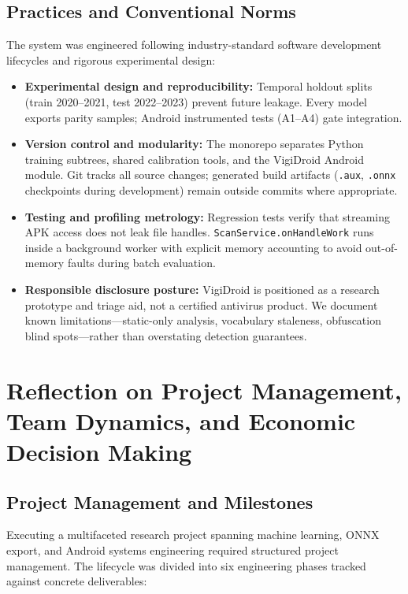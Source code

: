 \subsection{Practices and Conventional Norms}
The system was engineered following industry-standard software development lifecycles and rigorous experimental design:
\begin{itemize}
 \item \textbf{Experimental design and reproducibility:} Temporal holdout splits (train 2020--2021, test 2022--2023) prevent future leakage. Every model exports parity samples; Android instrumented tests (A1--A4) gate integration.
 \item \textbf{Version control and modularity:} The monorepo separates Python training subtrees, shared calibration tools, and the VigiDroid Android module. Git tracks all source changes; generated build artifacts (\texttt{.aux}, \texttt{.onnx} checkpoints during development) remain outside commits where appropriate.
 \item \textbf{Testing and profiling metrology:} Regression tests verify that streaming APK access does not leak file handles. \texttt{ScanService.onHandleWork} runs inside a background worker with explicit memory accounting to avoid out-of-memory faults during batch evaluation.
 \item \textbf{Responsible disclosure posture:} VigiDroid is positioned as a research prototype and triage aid, not a certified antivirus product. We document known limitations---static-only analysis, vocabulary staleness, obfuscation blind spots---rather than overstating detection guarantees.
\end{itemize}

\section{Reflection on Project Management, Team Dynamics, and Economic Decision Making}

\subsection{Project Management and Milestones}
Executing a multifaceted research project spanning machine learning, ONNX export, and Android systems engineering required structured project management. The lifecycle was divided into six engineering phases tracked against concrete deliverables:

